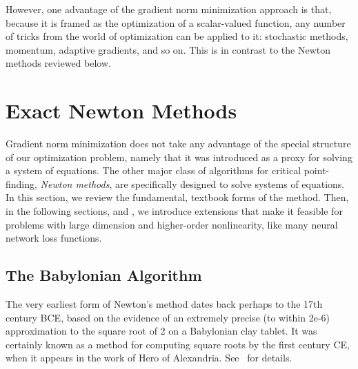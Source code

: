 \documentclass[../../thesis.tex]{subfiles}
\begin{document}
However, one advantage of the gradient norm minimization approach
is that, because it is framed as the optimization
of a scalar-valued function, any number of tricks
from the world of optimization can be applied to it:
stochastic methods, momentum, adaptive gradients,
and so on.
This is in contrast to the Newton methods reviewed below.

\section{Exact Newton Methods}

Gradient norm minimization does not take any advantage
of the special structure of our optimization problem,
namely that it was introduced
as a proxy for solving a system of equations.
The other major class of algorithms
for critical point-finding,
\emph{Newton methods},
are specifically designed to solve systems of equations.
In this section,
we review the fundamental, textbook forms
of the method.
Then, in the following sections,
 and ,
we introduce extensions that make it feasible for
problems with large dimension and higher-order nonlinearity,
like many neural network loss functions.

\subsection{The Babylonian Algorithm}

The very earliest form of Newton's method
dates back perhaps to the 17th century BCE,
based on the evidence of an extremely precise
(to within 2e-6)
approximation to the square root of 2
on a Babylonian clay tablet.
It was certainly known as a method
for computing square roots by the first century CE,
when it appears in the work of Hero of Alexandria.
See~\cite{brown1999} for details.
\end{document}
